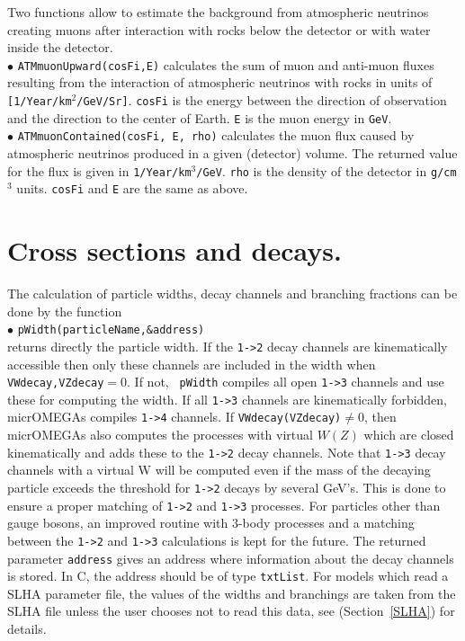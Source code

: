 \documentclass[12pt,a4paper]{article}
\begin{document}
Two functions allow to estimate the background from atmospheric neutrinos creating muons after interaction  with rocks below the detector  or with water inside the detector.\\
\noindent $\bullet$  \verb|ATMmuonUpward(cosFi,E)| calculates the sum of  muon
and anti-muon fluxes resulting from the
interaction of  atmospheric  neutrinos with rocks in units of  
\verb|[1/Year/km|$^2$\verb|/GeV/Sr]|. \verb|cosFi|  is the energy between the direction of
observation and the direction to the center of Earth. \verb|E|  is the  muon energy in
{\tt GeV}.\\
\noindent $\bullet$  \verb|ATMmuonContained(cosFi, E, rho)| calculates the muon flux
caused by atmospheric  neutrinos  produced in a given (detector)
volume. The returned value for the flux is given in  \verb|1/Year/km|$^3$\verb|/GeV|. {\tt rho} is
the density of the detector in \verb|g/cm|$^3$ units. {\tt cosFi} and {\tt E} are the
same as above. 



\section{Cross sections and decays.}
\label{cross_section}

The calculation of particle widths, decay channels  and branching fractions
can be done by the function\\

\noindent
$\bullet$ \verb|pWidth(particleName,&address)|\\
returns directly the particle width. If the  \verb|1->2| 
decay channels are kinematically accessible then only these channels are
included in the width when \verb|VWdecay,VZdecay|$ = 0$.  If not, {\tt
pWidth} compiles all open \verb|1->3| channels and use these for  computing the width.
If all \verb|1->3| channels are kinematically forbidden, micrOMEGAs compiles \verb|1->4| channels.
If \verb|VWdecay(VZdecay)|$\ne 0$, then micrOMEGAs  also computes the processes with virtual $W(Z)$ which 
are closed kinematically and adds these to the \verb|1->2| decay channels.
 Note that \verb|1->3| decay channels with a virtual W  will be computed even
if the mass of the decaying particle exceeds the threshold for \verb|1->2| decays by several GeV's. This is done to ensure a 
proper matching of \verb|1->2| and \verb|1->3| processes.  For  particles other than gauge bosons,
an improved routine with 3-body processes and a matching  between
the \verb|1->2| and \verb|1->3| calculations is kept for the future. 
The returned  parameter \verb|address| 
gives  an address where information about the decay channels is stored.
In C, the address should be of type {\tt  txtList}.
For models which read a SLHA parameter file, the values of the widths and branchings are taken from the SLHA
file unless the user chooses not to read this data, see (Section~\ref{SLHA}) for details.
  
\end{document}
